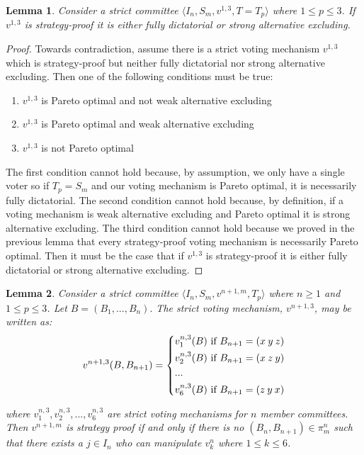 \documentclass{amsart}
\newtheorem{lemma}{Lemma}
\theoremstyle{plain}
\begin{document}
\begin{lemma}
    Consider a strict committee $\langle I_n, S_m, v^{1,3}, T = T_p \rangle$ where $1 \le p \le 3$. If $v^{1,3}$ is strategy-proof it is either fully dictatorial or strong alternative excluding.
\end{lemma}

\begin{proof}
    
Towards contradiction, assume there is a strict voting mechanism $v^{1,3}$ which is strategy-proof but neither fully dictatorial nor strong alternative excluding. Then one of the following conditions must be true:

\begin{enumerate} [a]
\item $v^{1,3}$ is Pareto optimal and not weak alternative excluding
\item $v^{1,3}$ is Pareto optimal and weak alternative excluding
\item $v^{1,3}$ is not Pareto optimal
\end{enumerate}

The first condition cannot hold because, by assumption, we only have a single voter so if $T_p = S_m$ and our voting mechanism is Pareto optimal, it is necessarily fully dictatorial. The second condition cannot hold because, by definition, if a voting mechanism is weak alternative excluding and Pareto optimal it is strong alternative excluding. The third condition cannot hold because we proved in the previous lemma that every strategy-proof voting mechanism is necessarily Pareto optimal. Then it must be the case that if $v^{1,3}$ is strategy-proof it is either fully dictatorial or strong alternative excluding. 
\end{proof}


\begin{lemma}
    Consider a strict committee $\langle I_n, S_m, v^{n+1,m}, T_p \rangle$ where $n \ge 1$ and $1 \le p \le 3$. Let $B = (B_1, ... , B_n).$ The strict voting mechanism, $v^{n+1, 3}$, may be written as:
    \[ v^{n+1,3}(B, B_{n+1}) = 
    \begin{dcases}
       v_1^{n,3}(B) \text{ if } B_{n+1} = (x \: y \: z)  \\  
       v_2^{n,3}(B) \text{ if } B_{n+1} = (x \: z \: y)  \\
       ... \\
       v_6^{n,3}(B) \text{ if } B_{n+1} = (z \: y \: x) 
    \end{dcases}
\]

where ${v_1^{n,3}, v_2^{n,3}, ... , v_6^{n,3}}$ are strict voting mechanisms for $n$ member committees. Then $v^{n+1,m}$ is strategy proof if and only if there is no $(B_n, B_{n+1}) \in \pi_m^n$ such that there exists a $j \in I_n$ who can manipulate $v_k^n$ where $1 \le k \le 6$.
\end{lemma}
\end{document}
